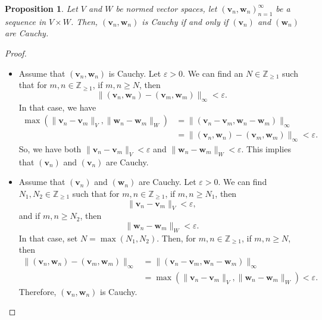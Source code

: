 \documentclass[a4paper, openany]{memoir}
\theoremstyle{definition}
\theoremstyle{plain}
\newtheorem{proposition}[definition]{Proposition}
\begin{document}
    \begin{proposition}
        Let $V$ and $W$ be normed vector spaces, let $(\bm{v}_n, \bm{w}_n)_{n=1}^\infty$ be a sequence in $V \times W$. Then, $(\bm{v}_n, \bm{w}_n)$ is Cauchy if and only if $(\bm{v}_n)$ and $(\bm{w}_n)$ are Cauchy.
    \end{proposition}
    \begin{proof}
        \hspace*{0pt}
        \begin{itemize}
            \item Assume that $(\bm{v}_n, \bm{w}_n)$ is Cauchy. Let $\varepsilon > 0$. We can find an $N \in \mathbb{Z}_{\geq 1}$ such that for $m, n \in \mathbb{Z}_{\geq 1}$, if $m, n \geq N$, then
            \[\lVert (\bm{v}_n, \bm{w}_n) - (\bm{v}_m, \bm{w}_m) \rVert_\infty < \varepsilon.\]
            In that case, we have
            \begin{align*}
                \max(\lVert \bm{v}_n - \bm{v}_m \rVert_V, \lVert \bm{w}_n - \bm{w}_m \rVert_W) &= \lVert (\bm{v}_n - \bm{v}_m, \bm{w}_n - \bm{w}_m) \rVert_\infty \\
                &= \lVert (\bm{v}_n, \bm{w}_n) - (\bm{v}_m, \bm{w}_m) \rVert_\infty < \varepsilon.
            \end{align*}
            So, we have both $\lVert \bm{v}_n - \bm{v}_m \rVert_V < \varepsilon$ and $\lVert \bm{w}_n - \bm{w}_m \rVert_W < \varepsilon$. This implies that $(\bm{v}_n)$ and $(\bm{v}_n)$ are Cauchy.

            \item Assume that $(\bm{v}_n)$ and $(\bm{w}_n)$ are Cauchy. Let $\varepsilon > 0$. We can find $N_1, N_2 \in \mathbb{Z}_{\geq 1}$ such that for $m, n \in \mathbb{Z}_{\geq 1}$, if $m, n \geq N_1$, then 
            \[\lVert \bm{v}_n - \bm{v}_m \rVert_V < \varepsilon,\]
            and if $m, n \geq N_2$, then 
            \[\lVert \bm{w}_n - \bm{w}_m \rVert_W < \varepsilon.\]
            In that case, set $N = \max(N_1, N_2)$. Then, for $m, n \in \mathbb{Z}_{\geq 1}$, if $m, n \geq N$, then
            \begin{align*}
                \lVert (\bm{v}_n, \bm{w}_n) - (\bm{v}_m, \bm{w}_m) \rVert_\infty &= \lVert (\bm{v}_n - \bm{v}_m, \bm{w}_n - \bm{w}_m) \rVert_\infty \\
                &= \max(\lVert \bm{v}_n - \bm{v}_m \rVert_V, \lVert \bm{w}_n - \bm{w}_m \rVert_W) < \varepsilon.
            \end{align*}
            Therefore, $(\bm{v}_n, \bm{w}_n)$ is Cauchy.
        \end{itemize}
    \end{proof}
    
\end{document}
